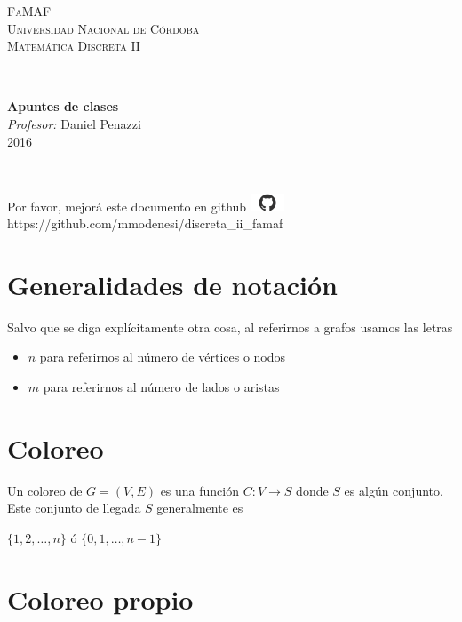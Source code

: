 \documentclass[10pt,a4paper]{article}
\begin{document}
\begin{titlepage}
\newcommand{\HRule}{\rule{\linewidth}{0.5mm}}
\center
\textsc{\Large{FaMAF}}\\[0.5cm]
\textsc{\large{Universidad Nacional de Córdoba}}\\[0.5cm]
\textsc{\LARGE{Matemática Discreta II}}\\[1.5cm]

\HRule\\[0.4cm]
{\huge \bfseries Apuntes de clases}\\
\vspace{1cm}
\Large \emph{Profesor:} Daniel Penazzi\\
2016
\HRule\\[4.5cm]

\vspace*{\fill}
Por favor, mejorá este documento en github
\includegraphics[width=1cm]{definitions/github-mark.png}
https://github.com/mmodenesi/discreta\_ii\_famaf
\end{titlepage}

\section*{Generalidades de notación}

Salvo que se diga explícitamente otra cosa, al referirnos a grafos usamos las letras

\begin{itemize}

	\item $n$ para referirnos al número de vértices o nodos
	\item $m$ para referirnos al número de lados o aristas
\end{itemize}

\section*{Coloreo}

Un coloreo de $G = (V, E)$ es una función $C: V \rightarrow S$ donde $S$ es algún conjunto. Este conjunto de llegada $S$ generalmente es

\begin{center}
$\{1, 2,\dots, n\}$ ó $\{0, 1, \dots, n-1\}$
\end{center}

\section*{Coloreo propio}
\end{document}
